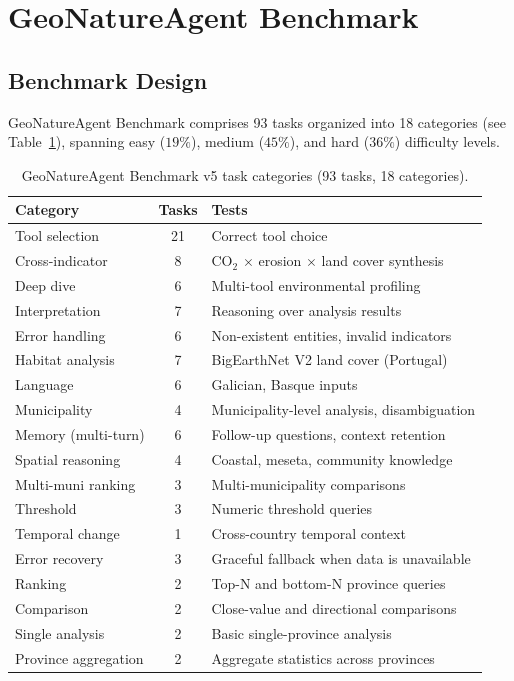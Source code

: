 \documentclass[sigconf]{acmart}
\begin{document}
\section{GeoNatureAgent Benchmark}
\label{sec:benchmark}


\subsection{Benchmark Design}

GeoNatureAgent Benchmark comprises 93 tasks organized into 18 categories (see Table~\ref{tab:categories}), spanning easy ($19\%$), medium ($45\%$), and hard ($36\%$) difficulty levels.

\begin{table}[ht]
    \caption{GeoNatureAgent Benchmark v5 task categories (93 tasks, 18 categories).}
    \label{tab:categories}
    \centering
    \begin{tabular}{lcp{3.9cm}}
        \toprule
        \textbf{Category} & \textbf{Tasks} & \textbf{Tests} \\
        \midrule
        Tool selection         & 21 & Correct tool choice\\
        Cross-indicator        &  8 & CO$_2$ $\times$ erosion $\times$ land cover synthesis \\
        Deep dive              &  6 & Multi-tool environmental profiling \\
        Interpretation         &  7 & Reasoning over analysis results \\
        Error handling         &  6 & Non-existent entities, invalid indicators \\
        Habitat analysis       &  7 & BigEarthNet V2 land cover (Portugal) \\
        Language               &  6 & Galician, Basque inputs \\
        Municipality           &  4 & Municipality-level analysis, disambiguation \\
        Memory (multi-turn)    &  6 & Follow-up questions, context retention \\
        Spatial reasoning      &  4 & Coastal, meseta, community knowledge \\
        Multi-muni ranking     &  3 & Multi-municipality comparisons \\
        Threshold              &  3 & Numeric threshold queries \\
        Temporal change        &  1 & Cross-country temporal context \\
        Error recovery         &  3 & Graceful fallback when data is unavailable \\
        Ranking                &  2 & Top-N and bottom-N province queries \\
        Comparison             &  2 & Close-value and directional comparisons \\
        Single analysis        &  2 & Basic single-province analysis \\
        Province aggregation   &  2 & Aggregate statistics across provinces \\
        \bottomrule
    \end{tabular}
\end{table}
\end{document}
